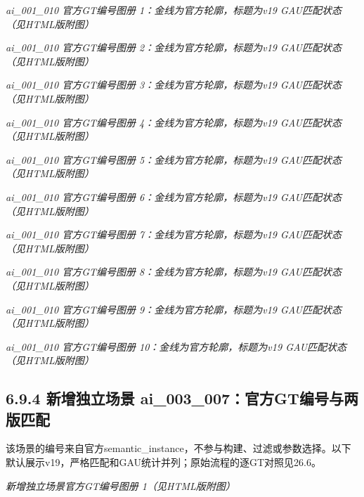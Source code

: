 \documentclass[UTF8,fontset=fandol]{ctexart}
\begin{document}
\textit{ai\_001\_010 官方GT编号图册 1：金线为官方轮廓，标题为v19 GAU匹配状态（见HTML版附图）}



\textit{ai\_001\_010 官方GT编号图册 2：金线为官方轮廓，标题为v19 GAU匹配状态（见HTML版附图）}



\textit{ai\_001\_010 官方GT编号图册 3：金线为官方轮廓，标题为v19 GAU匹配状态（见HTML版附图）}



\textit{ai\_001\_010 官方GT编号图册 4：金线为官方轮廓，标题为v19 GAU匹配状态（见HTML版附图）}



\textit{ai\_001\_010 官方GT编号图册 5：金线为官方轮廓，标题为v19 GAU匹配状态（见HTML版附图）}



\textit{ai\_001\_010 官方GT编号图册 6：金线为官方轮廓，标题为v19 GAU匹配状态（见HTML版附图）}



\textit{ai\_001\_010 官方GT编号图册 7：金线为官方轮廓，标题为v19 GAU匹配状态（见HTML版附图）}



\textit{ai\_001\_010 官方GT编号图册 8：金线为官方轮廓，标题为v19 GAU匹配状态（见HTML版附图）}



\textit{ai\_001\_010 官方GT编号图册 9：金线为官方轮廓，标题为v19 GAU匹配状态（见HTML版附图）}



\textit{ai\_001\_010 官方GT编号图册 10：金线为官方轮廓，标题为v19 GAU匹配状态（见HTML版附图）}



\subsection*{6.9.4 新增独立场景 ai\_003\_007：官方GT编号与两版匹配}

该场景的编号来自官方semantic\_instance，不参与构建、过滤或参数选择。以下默认展示v19，严格匹配和GAU统计并列；原始流程的逐GT对照见26.6。



\textit{新增独立场景官方GT编号图册 1（见HTML版附图）}
\end{document}
